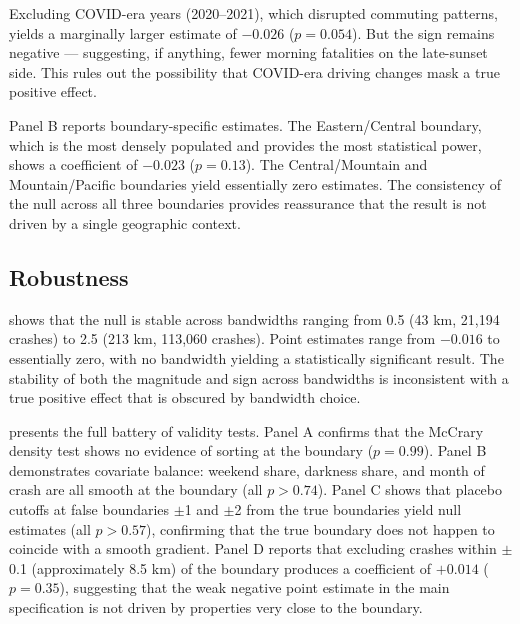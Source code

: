 \documentclass[12pt]{article}
\begin{document}
Excluding COVID-era years (2020--2021), which disrupted commuting patterns, yields a marginally larger estimate of $-0.026$ ($p = 0.054$). But the sign remains negative --- suggesting, if anything, fewer morning fatalities on the late-sunset side. This rules out the possibility that COVID-era driving changes mask a true positive effect.

Panel B reports boundary-specific estimates. The Eastern/Central boundary, which is the most densely populated and provides the most statistical power, shows a coefficient of $-0.023$ ($p = 0.13$). The Central/Mountain and Mountain/Pacific boundaries yield essentially zero estimates. The consistency of the null across all three boundaries provides reassurance that the result is not driven by a single geographic context.

\subsection{Robustness}



 shows that the null is stable across bandwidths ranging from 0.5\textdegree{} (43 km, 21,194 crashes) to 2.5\textdegree{} (213 km, 113,060 crashes). Point estimates range from $-0.016$ to essentially zero, with no bandwidth yielding a statistically significant result. The stability of both the magnitude and sign across bandwidths is inconsistent with a true positive effect that is obscured by bandwidth choice.



 presents the full battery of validity tests. Panel A confirms that the McCrary density test \citep{cattaneo2020density} shows no evidence of sorting at the boundary ($p = 0.99$). Panel B demonstrates covariate balance: weekend share, darkness share, and month of crash are all smooth at the boundary (all $p > 0.74$). Panel C shows that placebo cutoffs at false boundaries $\pm$1\textdegree{} and $\pm$2\textdegree{} from the true boundaries yield null estimates (all $p > 0.57$), confirming that the true boundary does not happen to coincide with a smooth gradient. Panel D reports that excluding crashes within $\pm$0.1\textdegree{} (approximately 8.5 km) of the boundary produces a coefficient of $+0.014$ ($p = 0.35$), suggesting that the weak negative point estimate in the main specification is not driven by properties very close to the boundary.
\end{document}
